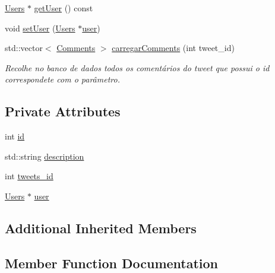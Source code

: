 \begin{DoxyCompactItemize}
\hyperlink{class_t_a_d_1_1_users}{Users} $\ast$ \hyperlink{class_t_a_d_1_1_comments_a58ed274ef7b23ec769db9957a3372381}{get\+User} () const
\item 
void \hyperlink{class_t_a_d_1_1_comments_a640bf5815df8f79ac9900a0f97dcf8fc}{set\+User} (\hyperlink{class_t_a_d_1_1_users}{Users} $\ast$\hyperlink{class_t_a_d_1_1_comments_a33d578ff96661f21cc9a6de37bb21256}{user})
\item 
std\+::vector$<$ \hyperlink{class_t_a_d_1_1_comments}{Comments} $>$ \hyperlink{class_t_a_d_1_1_comments_aa760a8d05ae39304d40a70341766d434}{carregar\+Comments} (int tweet\+\_\+id)
\begin{DoxyCompactList}\small\item\em Recolhe no banco de dados todos os comentários do tweet que possui o id correspondete com o parâmetro. \end{DoxyCompactList}\end{DoxyCompactItemize}
\subsection*{Private Attributes}
\begin{DoxyCompactItemize}
\item 
int \hyperlink{class_t_a_d_1_1_comments_aa79c05cab480f12f13d9864b9791d972}{id}
\item 
std\+::string \hyperlink{class_t_a_d_1_1_comments_a3b6ff92ac725fdee6c109036eebc889d}{description}
\item 
int \hyperlink{class_t_a_d_1_1_comments_afbe4b492056ffa01d03c7ae846d50ea2}{tweets\+\_\+id}
\item 
\hyperlink{class_t_a_d_1_1_users}{Users} $\ast$ \hyperlink{class_t_a_d_1_1_comments_a33d578ff96661f21cc9a6de37bb21256}{user}
\end{DoxyCompactItemize}
\subsection*{Additional Inherited Members}


\subsection{Member Function Documentation}
\mbox{\label{class_t_a_d_1_1_comments_aa760a8d05ae39304d40a70341766d434}} 
